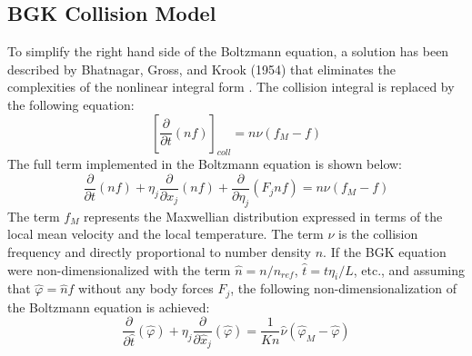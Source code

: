 \documentclass[a4paper]{article}
\begin{document}
\subsection{BGK Collision Model}
To simplify the right hand side of the Boltzmann equation, a solution has been described by Bhatnagar, Gross, and Krook (1954) that eliminates the complexities of the nonlinear integral form \cite{bhatnagar1954model}. The collision integral is replaced by the following equation:
\begin{equation}
    \left[\dfrac{\partial}{\partial t} (nf)\right]_{coll} = n \nu (f_M - f)
\end{equation}
The full term implemented in the Boltzmann equation is shown below:
\begin{equation}
    \dfrac{\partial}{\partial t}(nf) + \eta_j \dfrac{\partial}{\partial x_j} (nf)  + \dfrac{\partial}{\partial \eta_j} (F_j nf) = n \nu (f_M - f)
\end{equation}
The term $f_M$ represents the Maxwellian distribution expressed in terms of the local mean velocity and the local temperature. The term $\nu$ is the collision frequency and directly proportional to number density $n$. If the BGK equation were non-dimensionalized with the term $\hat{n} = n/n_{ref}$, $\hat{t} = t\eta_i/L$, etc., and assuming that $\hat{\varphi} = \hat{n}\hat{f}$ without any body forces $F_j$, the following non-dimensionalization of the Boltzmann equation is achieved:
\begin{equation}
    \dfrac{\partial}{\partial \hat{t}}(\hat{\varphi}) + \eta_j \dfrac{\partial}{\partial \hat{x}_j} (\hat{\varphi})  = \dfrac{1}{Kn}\hat{\nu} (\hat{\varphi}_M - \hat{\varphi})
\end{equation}
\end{document}
